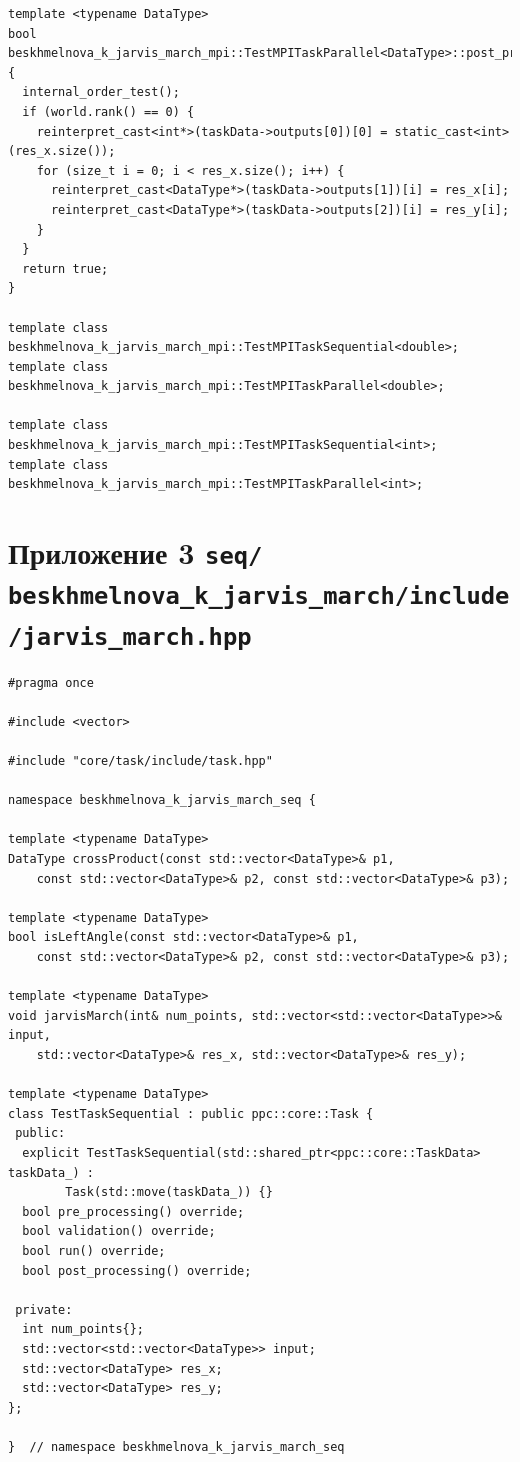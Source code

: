 \documentclass[a4paper,12pt]{article}
\begin{document}
{\begin{lstlisting}
template <typename DataType>
bool beskhmelnova_k_jarvis_march_mpi::TestMPITaskParallel<DataType>::post_processing() {
  internal_order_test();
  if (world.rank() == 0) {
    reinterpret_cast<int*>(taskData->outputs[0])[0] = static_cast<int>(res_x.size());
    for (size_t i = 0; i < res_x.size(); i++) {
      reinterpret_cast<DataType*>(taskData->outputs[1])[i] = res_x[i];
      reinterpret_cast<DataType*>(taskData->outputs[2])[i] = res_y[i];
    }
  }
  return true;
}

template class beskhmelnova_k_jarvis_march_mpi::TestMPITaskSequential<double>;
template class beskhmelnova_k_jarvis_march_mpi::TestMPITaskParallel<double>;

template class beskhmelnova_k_jarvis_march_mpi::TestMPITaskSequential<int>;
template class beskhmelnova_k_jarvis_march_mpi::TestMPITaskParallel<int>;
\end{lstlisting}
}

\newpage

\section{Приложение 3 \texttt{seq/ beskhmelnova\_k\_jarvis\_march/include/jarvis\_march.hpp}}
{\footnotesize
\begin{lstlisting}
#pragma once

#include <vector>

#include "core/task/include/task.hpp"

namespace beskhmelnova_k_jarvis_march_seq {

template <typename DataType>
DataType crossProduct(const std::vector<DataType>& p1, 
	const std::vector<DataType>& p2, const std::vector<DataType>& p3);

template <typename DataType>
bool isLeftAngle(const std::vector<DataType>& p1, 
	const std::vector<DataType>& p2, const std::vector<DataType>& p3);

template <typename DataType>
void jarvisMarch(int& num_points, std::vector<std::vector<DataType>>& input, 
	std::vector<DataType>& res_x, std::vector<DataType>& res_y);

template <typename DataType>
class TestTaskSequential : public ppc::core::Task {
 public:
  explicit TestTaskSequential(std::shared_ptr<ppc::core::TaskData> taskData_) : 
		Task(std::move(taskData_)) {}
  bool pre_processing() override;
  bool validation() override;
  bool run() override;
  bool post_processing() override;

 private:
  int num_points{};
  std::vector<std::vector<DataType>> input;
  std::vector<DataType> res_x;
  std::vector<DataType> res_y;
};

}  // namespace beskhmelnova_k_jarvis_march_seq
\end{lstlisting}
}
\newpage
\end{document}
